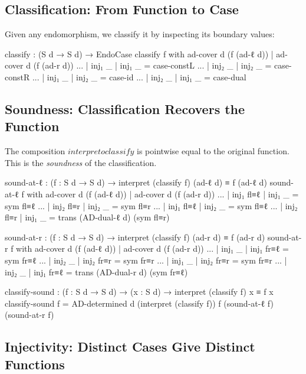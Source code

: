 \documentclass[11pt,a4paper]{book}
\def\circ{o}%
\def\texttt#1{#1}%
\begin{document}
\subsection{Classification: From Function to Case}

Given any endomorphism, we classify it by inspecting its boundary values:

\begin{code}
  classify : (S d → S d) → EndoCase
  classify f with ad-cover d (f (ad-ℓ d)) | ad-cover d (f (ad-r d))
  ... | inj₁ _ | inj₁ _ = case-constL
  ... | inj₂ _ | inj₂ _ = case-constR
  ... | inj₁ _ | inj₂ _ = case-id
  ... | inj₂ _ | inj₁ _ = case-dual
\end{code}

\subsection{Soundness: Classification Recovers the Function}

The composition $\texttt{interpret} \circ \texttt{classify}$ is pointwise
equal to the original function. This is the \emph{soundness} of the classification.

\begin{code}
  sound-at-ℓ : (f : S d → S d) →
               interpret (classify f) (ad-ℓ d) ≡ f (ad-ℓ d)
  sound-at-ℓ f with ad-cover d (f (ad-ℓ d)) | ad-cover d (f (ad-r d))
  ... | inj₁ fl≡ℓ | inj₁ _     = sym fl≡ℓ
  ... | inj₂ fl≡r | inj₂ _     = sym fl≡r
  ... | inj₁ fl≡ℓ | inj₂ _     = sym fl≡ℓ
  ... | inj₂ fl≡r | inj₁ _     = trans (AD-dual-ℓ d) (sym fl≡r)

  sound-at-r : (f : S d → S d) →
               interpret (classify f) (ad-r d) ≡ f (ad-r d)
  sound-at-r f with ad-cover d (f (ad-ℓ d)) | ad-cover d (f (ad-r d))
  ... | inj₁ _     | inj₁ fr≡ℓ = sym fr≡ℓ
  ... | inj₂ _     | inj₂ fr≡r = sym fr≡r
  ... | inj₁ _     | inj₂ fr≡r = sym fr≡r
  ... | inj₂ _     | inj₁ fr≡ℓ = trans (AD-dual-r d) (sym fr≡ℓ)

  classify-sound : (f : S d → S d) →
                   (x : S d) → interpret (classify f) x ≡ f x
  classify-sound f = AD-determined d
    (interpret (classify f)) f
    (sound-at-ℓ f) (sound-at-r f)
\end{code}

\subsection{Injectivity: Distinct Cases Give Distinct Functions}
\end{document}
